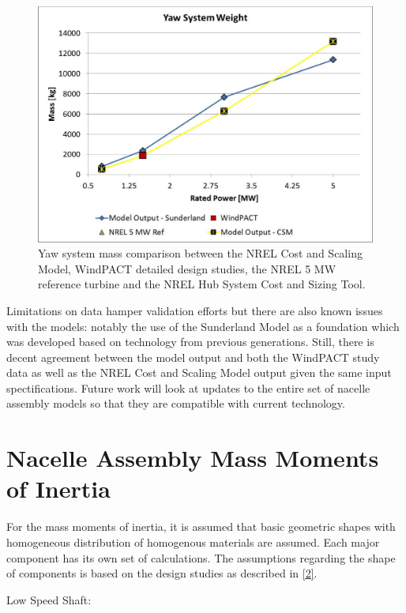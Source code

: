 \documentclass[letterpaper,10pt,openany,oneside]{sphinxmanual}
\begin{document}
\begin{figure}[htbp]
\centering
\capstart

\includegraphics[width=6.5in]{yawmass.pdf}
\caption{Yaw system mass comparison between the NREL Cost and Scaling Model, WindPACT detailed design studies, the NREL 5 MW reference turbine and the NREL Hub System Cost and Sizing Tool.}\label{theory:yawmass}\end{figure}

Limitations on data hamper validation efforts but there are also known issues with the models: notably the use of the Sunderland Model as a foundation which was developed based on technology from previous generations.  Still, there is decent agreement between the model output and both the WindPACT study data as well as the NREL Cost and Scaling Model output given the same input spectifications.  Future work will look at updates to the entire set of nacelle assembly models so that they are compatible with current technology.


\section{Nacelle Assembly Mass Moments of Inertia}
\label{theory:nacelle-assembly-mass-moments-of-inertia}
For the mass moments of inertia, it is assumed that basic geometric shapes with homogeneous distribution of homogenous materials are assumed.  Each major component has its own set of calculations.  The assumptions regarding the shape of components is based on the design studies as described in {\hyperref[theory:2]{{[}2{]}}}.

Low Speed Shaft:
\end{document}

